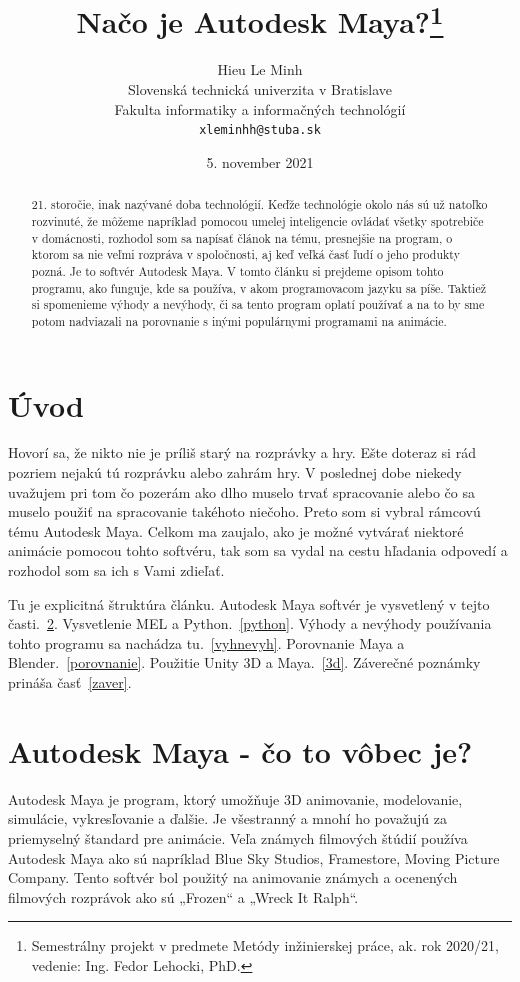 \documentclass[10pt,oneside,slovak,a4paper]{article}
\title{Načo je Autodesk Maya?\thanks{Semestrálny projekt v predmete Metódy inžinierskej práce, ak. rok 2020/21, vedenie: Ing. Fedor Lehocki, PhD.}}
\author{Hieu Le Minh\\[2pt]
	{\small Slovenská technická univerzita v Bratislave}\\
	{\small Fakulta informatiky a informačných technológií}\\
	{\small \texttt{xleminhh@stuba.sk}}
	}
\date{\small 5. november 2021}
\begin{document}
\maketitle

\begin{abstract}
21. storočie, inak nazývané doba technológií. Keďže technológie okolo nás sú už natoľko rozvinuté, že môžeme napríklad pomocou umelej inteligencie ovládať všetky spotrebiče v domácnosti,
rozhodol som sa napísať článok na tému, presnejšie na program, o ktorom sa nie veľmi rozpráva v spoločnosti, aj keď veľká časť ľudí o jeho produkty pozná. Je to softvér Autodesk Maya.
V tomto článku si prejdeme opisom tohto programu, ako funguje, kde sa používa, v akom 
programovacom jazyku sa píše. Taktiež si spomenieme výhody a nevýhody, či 
sa tento program oplatí používať a na to by sme potom nadviazali na porovnanie s inými populárnymi programami na animácie.
\end{abstract}



\section{Úvod}

Hovorí sa, že nikto nie je príliš starý na rozprávky a hry. Ešte doteraz si rád pozriem nejakú tú rozprávku alebo zahrám hry. V poslednej dobe niekedy uvažujem pri tom čo pozerám ako dlho muselo trvať spracovanie alebo čo sa muselo použiť na spracovanie takéhoto niečoho. Preto som si vybral rámcovú tému Autodesk Maya. Celkom ma zaujalo, ako je možné vytvárať niektoré animácie pomocou tohto softvéru, tak som sa vydal na cestu hľadania odpovedí a rozhodol som sa ich s Vami zdieľať.


Tu je explicitná štruktúra článku.
Autodesk Maya softvér je vysvetlený v tejto časti.~\ref{AM}.
Vysvetlenie MEL a Python.~\ref{python}.
Výhody a nevýhody používania tohto programu sa nachádza tu.~\ref{vyhnevyh}.
Porovnanie Maya a Blender.~\ref{porovnanie}.
Použitie Unity 3D a Maya.~\ref{3d}.
Záverečné poznámky prináša časť~\ref{zaver}.



\section{Autodesk Maya - čo to vôbec je?} \label{AM}

Autodesk Maya je program, ktorý umožňuje 3D animovanie, modelovanie, simulácie, vykresľovanie a ďalšie. Je všestranný a mnohí ho považujú za priemyselný štandard pre animácie. Veľa známych filmových štúdií používa Autodesk Maya ako sú napríklad Blue Sky Studios, Framestore, Moving Picture Company. Tento softvér bol použitý na animovanie známych a ocenených filmových rozprávok ako sú „Frozen“ a „Wreck It Ralph“.\\
\end{document}
